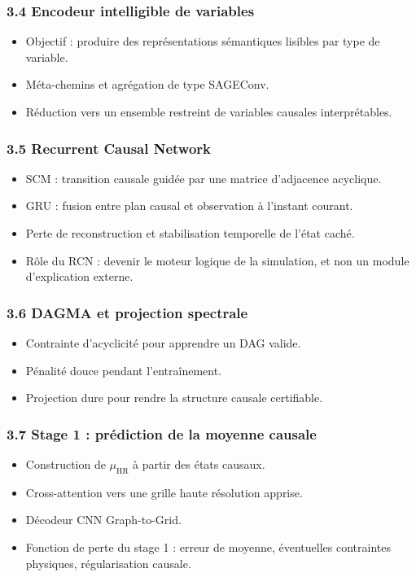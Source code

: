 \documentclass[12pt,a4paper]{article}
\begin{document}
\subsubsection*{3.4 Encodeur intelligible de variables}
\begin{itemize}
    \item Objectif : produire des repr\'esentations s\'emantiques lisibles par type de variable.
    \item M\'eta-chemins et agr\'egation de type SAGEConv.
    \item R\'eduction vers un ensemble restreint de variables causales interpr\'etables.
\end{itemize}

\subsubsection*{3.5 Recurrent Causal Network}
\begin{itemize}
    \item SCM : transition causale guid\'ee par une matrice d'adjacence acyclique.
    \item GRU : fusion entre plan causal et observation \`a l'instant courant.
    \item Perte de reconstruction et stabilisation temporelle de l'\'etat cach\'e.
    \item R\^ole du RCN : devenir le moteur logique de la simulation, et non un module d'explication externe.
\end{itemize}

\subsubsection*{3.6 DAGMA et projection spectrale}
\begin{itemize}
    \item Contrainte d'acyclicit\'e pour apprendre un DAG valide.
    \item P\'enalit\'e douce pendant l'entra\^inement.
    \item Projection dure pour rendre la structure causale certifiable.
\end{itemize}

\subsubsection*{3.7 Stage 1 : pr\'ediction de la moyenne causale}
\begin{itemize}
    \item Construction de $\mu_{\mathrm{HR}}$ \`a partir des \'etats causaux.
    \item Cross-attention vers une grille haute r\'esolution apprise.
    \item D\'ecodeur CNN Graph-to-Grid.
    \item Fonction de perte du stage 1 : erreur de moyenne, \'eventuelles contraintes physiques, r\'egularisation causale.
\end{itemize}
\end{document}
